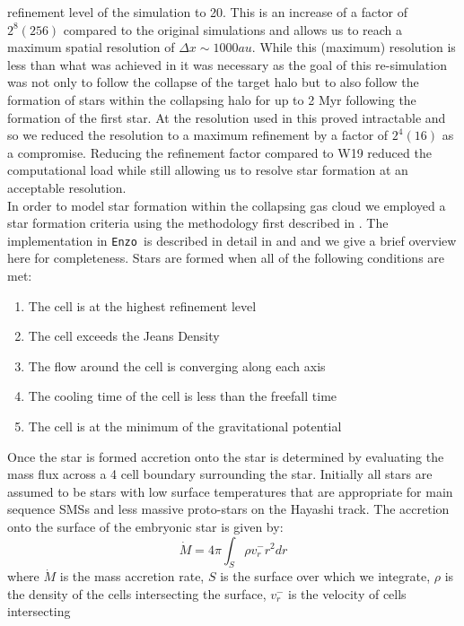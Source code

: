 \documentclass[graphics, twocolumn, usenatbib]{mn2e}
\newcommand{\enzo}{\texttt{Enzo~}}
\begin{document}
 refinement level of the simulation to 20. This is an increase of a factor of $2^8 (256)$ compared
 to the  original simulations and allows us to reach a maximum spatial resolution
 of $\Delta x \sim 1000 au$. While this (maximum) resolution is less than what was achieved
 in \cite{Wise_2019} it was necessary as the goal of this re-simulation was not only to follow
 the collapse of the target halo but to also follow the formation of stars within the collapsing
 halo for up to 2 Myr following the formation of the first star. At the resolution used in
 \cite{Wise_2019} this proved intractable and so we reduced the
 resolution to a maximum refinement by a factor of $2^4 (16)$ as a compromise. Reducing the
 refinement factor compared to W19 reduced the computational load while still allowing us to
 resolve star formation at an acceptable resolution. \\
 \indent In order to model star formation within the collapsing gas cloud we employed a star
 formation criteria using the methodology first described in \cite{Krumholz_2004}. The implementation
 in \enzo is described in detail in \cite{Regan_2018a} and \cite{Regan_2018b} and we give a
 brief overview here for completeness. Stars are formed when all of the following conditions are met:
\begin{enumerate}
\item The cell is at the highest refinement level
\item The cell exceeds the Jeans Density
\item The flow around the cell is converging along each axis
\item The cooling time of the cell is less than the freefall time
\item The cell is at the minimum of the gravitational potential
\end{enumerate}
Once the star is formed accretion onto the star is determined by evaluating the mass flux across
a 4 cell boundary surrounding the star. Initially all stars are assumed to be stars with low surface
temperatures that are appropriate for main sequence SMSs and less massive proto-stars on the
Hayashi track. The accretion onto the surface of the embryonic star is given by:
\begin{equation}
  \dot{M} = 4\pi \int_S {\rho v_r^- r^2 dr}
\end{equation}
where $\dot{M}$ is the mass accretion rate, $S$ is the surface over which we integrate, $\rho$ is the
density of the cells intersecting the surface, $v_r^-$ is the velocity of cells intersecting
\end{document}
